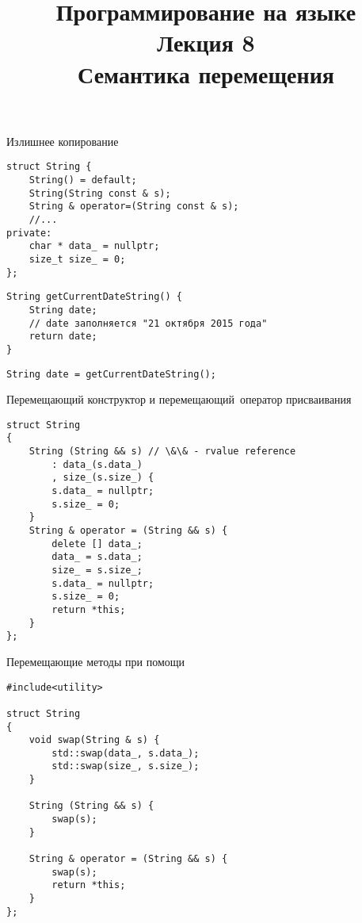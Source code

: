 \documentclass[aspectration=1610,t]{beamer}
\title{{\bf Программирование на языке \langcpp\protect\\Лекция
8\protect\vspace{1em}\\}Семантика перемещения}
\begin{document}
\begin{frame} 
  \titlepage
\end{frame}

\begin{frame}[fragile]{Излишнее копирование}
\begin{lstlisting}
struct String {
    String() = default;
    String(String const & s);
    String & operator=(String const & s);
    //...
private:
    char * data_ = nullptr;
    size_t size_ = 0;
};
\end{lstlisting}

\begin{lstlisting}
String getCurrentDateString() {
    String date;
    // date заполняется "21 октября 2015 года"
    return date;
}
\end{lstlisting}

\begin{lstlisting}
String date = getCurrentDateString();
\end{lstlisting}
\end{frame}

\begin{frame}[fragile]{Перемещающий конструктор и перемещающий~оператор присваивания}
\begin{lstlisting}
struct String 
{
    String (String && s) // \&\& - rvalue reference
        : data_(s.data_)
        , size_(s.size_) {
        s.data_ = nullptr;
        s.size_ = 0;
    }
    String & operator = (String && s) {
        delete [] data_;
        data_ = s.data_;
        size_ = s.size_;
        s.data_ = nullptr;
        s.size_ = 0;
        return *this;
    }
};
\end{lstlisting}
\end{frame}                                

\begin{frame}[fragile]{Перемещающие методы при помощи }
\begin{lstlisting}
#include<utility>

struct String 
{
    void swap(String & s) { 
        std::swap(data_, s.data_);
        std::swap(size_, s.size_);
    }

    String (String && s) { 
        swap(s);
    }
    
    String & operator = (String && s) {
        swap(s);
        return *this;
    }
};
\end{lstlisting}
\end{frame}
\end{document}
